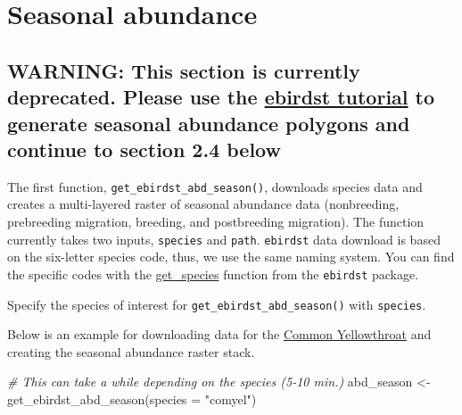 \documentclass[
]{book}
\newenvironment{Shaded}{\begin{snugshade}}{\end{snugshade}}
\newcommand{\AttributeTok}[1]{\textcolor[rgb]{0.77,0.63,0.00}{#1}}
\newcommand{\CommentTok}[1]{\textcolor[rgb]{0.56,0.35,0.01}{\textit{#1}}}
\newcommand{\FunctionTok}[1]{\textcolor[rgb]{0.00,0.00,0.00}{#1}}
\newcommand{\NormalTok}[1]{#1}
\newcommand{\OtherTok}[1]{\textcolor[rgb]{0.56,0.35,0.01}{#1}}
\newcommand{\StringTok}[1]{\textcolor[rgb]{0.31,0.60,0.02}{#1}}
\begin{document}
\hypertarget{seasonal-abundance}{%
\section{Seasonal abundance}\label{seasonal-abundance}}

\hypertarget{warning-this-section-is-currently-deprecated.-please-use-the-ebirdst-tutorial-to-generate-seasonal-abundance-polygons-and-continue-to-section-2.4-below}{%
\subsection{\texorpdfstring{WARNING: This section is currently deprecated. Please use the \href{https://cornelllabofornithology.github.io/ebirdst/articles/ebirdst-advanced-mapping.html}{ebirdst tutorial} to generate seasonal abundance polygons and continue to section 2.4 below}{WARNING: This section is currently deprecated. Please use the ebirdst tutorial to generate seasonal abundance polygons and continue to section 2.4 below}}\label{warning-this-section-is-currently-deprecated.-please-use-the-ebirdst-tutorial-to-generate-seasonal-abundance-polygons-and-continue-to-section-2.4-below}}

The first function, \texttt{get\_ebirdst\_abd\_season()}, downloads species data and creates a multi-layered raster of seasonal abundance data (nonbreeding, prebreeding migration, breeding, and postbreeding migration). The function currently takes two inputs, \texttt{species} and \texttt{path}. \texttt{ebirdst} data download is based on the six-letter species code, thus, we use the same naming system. You can find the specific codes with the \href{https://rdrr.io/github/CornellLabofOrnithology/ebirdst/man/get_species.html}{get\_species} function from the \texttt{ebirdst} package.

Specify the species of interest for \texttt{get\_ebirdst\_abd\_season()} with \texttt{species}.

Below is an example for downloading data for the \href{https://ebird.org/species/comyel}{Common Yellowthroat} and creating the seasonal abundance raster stack.

\begin{Shaded}
\begin{Highlighting}[]
\CommentTok{\# This can take a while depending on the species (5{-}10 min.)}
\NormalTok{abd\_season }\OtherTok{\textless{}{-}} \FunctionTok{get\_ebirdst\_abd\_season}\NormalTok{(}\AttributeTok{species =} \StringTok{"comyel"}\NormalTok{)}
\end{Highlighting}
\end{Shaded}
\end{document}
